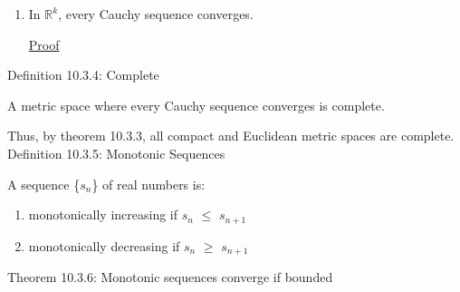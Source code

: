 \begin{enumerate}[label=(\alph*), leftmargin=2cm, itemsep=0.1cm]
\newpage

        \item In $\mathbb{R}^k$, every Cauchy sequence converges.
        
            { \color{magenta} \underline{Proof} }

    \end{enumerate}

    \vspace{0.5cm}

{ \color{blue} Definition 10.3.4: Complete } 

	\begin{adjustbox}{minipage=14cm, right, vspace=0.1cm 0cm}
		A metric space where every Cauchy sequence converges is complete.

		Thus, by {\color{red} theorem 10.3.3}, all compact and Euclidean
		metric spaces are complete. \\
	\end{adjustbox}

{ \color{blue} Definition 10.3.5: Monotonic Sequences } 

	\begin{adjustbox}{minipage=14cm, right, vspace=0.1cm 0cm}
		A sequence \{$s_n$\} of real numbers is:
	\end{adjustbox}

	\begin{enumerate}[label=(\alph*), leftmargin=2cm, itemsep=0.1cm]
		\item monotonically increasing if $s_n$ $\leq$ $s_{n+1}$
		
		\item monotonically decreasing if $s_n$ $\geq$ $s_{n+1}$ \\
	\end{enumerate}

{ \color{red} Theorem 10.3.6: Monotonic sequences converge if bounded } 

